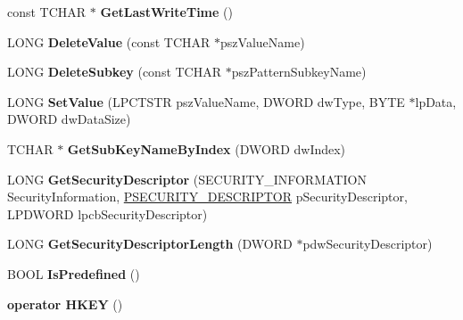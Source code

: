 \begin{DoxyCompactItemize}
const T\+C\+H\+AR $\ast$ {\bfseries Get\+Last\+Write\+Time} ()
\item 
\mbox{\label{class_c_registry_key_a5ca4ab1e41bc9e7d72e0054c0004e3d3}} 
L\+O\+NG {\bfseries Delete\+Value} (const T\+C\+H\+AR $\ast$psz\+Value\+Name)
\item 
\mbox{\label{class_c_registry_key_a9e2c6bd026dcfdbaf4836285a7521e24}} 
L\+O\+NG {\bfseries Delete\+Subkey} (const T\+C\+H\+AR $\ast$psz\+Pattern\+Subkey\+Name)
\item 
\mbox{\label{class_c_registry_key_afa6d2d2e939740590c504abf96ab5e5f}} 
L\+O\+NG {\bfseries Set\+Value} (L\+P\+C\+T\+S\+TR psz\+Value\+Name, D\+W\+O\+RD dw\+Type, B\+Y\+TE $\ast$lp\+Data, D\+W\+O\+RD dw\+Data\+Size)
\item 
\mbox{\label{class_c_registry_key_a3d04277738d6653c0f3cc8e065093c25}} 
T\+C\+H\+AR $\ast$ {\bfseries Get\+Sub\+Key\+Name\+By\+Index} (D\+W\+O\+RD dw\+Index)
\item 
\mbox{\label{class_c_registry_key_a3e92ce63b62efa3d3bafffcdbe7fdc77}} 
L\+O\+NG {\bfseries Get\+Security\+Descriptor} (S\+E\+C\+U\+R\+I\+T\+Y\+\_\+\+I\+N\+F\+O\+R\+M\+A\+T\+I\+ON Security\+Information, \hyperlink{struct___s_e_c_u_r_i_t_y___d_e_s_c_r_i_p_t_o_r}{P\+S\+E\+C\+U\+R\+I\+T\+Y\+\_\+\+D\+E\+S\+C\+R\+I\+P\+T\+OR} p\+Security\+Descriptor, L\+P\+D\+W\+O\+RD lpcb\+Security\+Descriptor)
\item 
\mbox{\label{class_c_registry_key_aedacdaaf333ed1bf93db78073514d741}} 
L\+O\+NG {\bfseries Get\+Security\+Descriptor\+Length} (D\+W\+O\+RD $\ast$pdw\+Security\+Descriptor)
\item 
\mbox{\label{class_c_registry_key_a923d7f4f1534850cd6f5d30566391590}} 
B\+O\+OL {\bfseries Is\+Predefined} ()
\item 
\mbox{\label{class_c_registry_key_a66d1b9f6585bf99dbb65fe848e3fae4a}} 
{\bfseries operator H\+K\+EY} ()
\end{DoxyCompactItemize}
